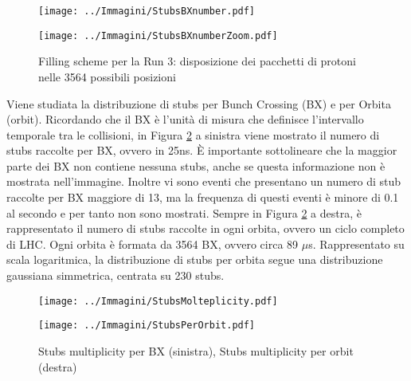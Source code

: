  \begin{figure}[t]
   \centering
   \begin{minipage}[b]{0.49\textwidth}
       \centering
       \texttt{[image: ../Immagini/StubsBXnumber.pdf]} 
     \end{minipage}
     \hfill 
     \begin{minipage}[b]{0.49\textwidth}
       \centering
       \texttt{[image: ../Immagini/StubsBXnumberZoom.pdf]} 
   \end{minipage}
   \caption{Filling scheme per la Run 3: disposizione dei pacchetti di protoni nelle 3564 possibili posizioni }
   \label{fig:Stubs1}
 \end{figure}


Viene studiata la distribuzione di stubs per Bunch Crossing (BX) e per Orbita (orbit). Ricordando che il BX è l'unità di misura che definisce l'intervallo temporale tra le collisioni, in Figura \ref{fig:StubsMolteplicity} a sinistra viene mostrato il numero di stubs raccolte per BX, ovvero in 25ns. È importante sottolineare che la maggior parte dei BX non contiene nessuna stubs, anche se questa informazione non è mostrata nell'immagine. Inoltre vi sono eventi che presentano un numero di stub raccolte per BX maggiore di 13, ma la frequenza di questi eventi è minore di 0.1 al secondo e per tanto non sono mostrati.\newline
Sempre in Figura \ref{fig:StubsMolteplicity} a destra, è rappresentato il numero di stubs raccolte in ogni orbita, ovvero un ciclo completo di LHC. Ogni orbita è formata da 3564 BX, ovvero circa 89 $\mu$s. Rappresentato su scala logaritmica, la distribuzione di stubs per orbita segue una distribuzione gaussiana simmetrica, centrata su 230 stubs. 

 \begin{figure}[b]
  \centering
  \begin{minipage}[b]{0.49\textwidth}
      \centering
      \texttt{[image: ../Immagini/StubsMolteplicity.pdf]} 
    \end{minipage}
    \hfill 
    \begin{minipage}[b]{0.49\textwidth}
      \centering
      \texttt{[image: ../Immagini/StubsPerOrbit.pdf]} 
  \end{minipage}
  \caption{Stubs multiplicity per BX (sinistra), Stubs multiplicity per orbit (destra)}
  \label{fig:StubsMolteplicity}
\end{figure}



